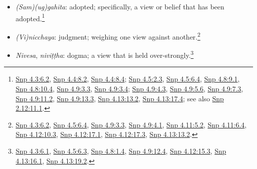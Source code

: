 \documentclass[12pt,openany]{book}%
\begin{document}
\begin{itemize}
\item \textit{(Sam)(ug)\textsanskrit{gahīta}}: adopted; specifically, a view or belief that has been adopted.\footnote{\href{https://suttacentral.net/snp4.3/en/sujato\#6.2}{Snp 4.3:6.2}, \href{https://suttacentral.net/snp4.4/en/sujato\#8.2}{Snp 4.4:8.2}, \href{https://suttacentral.net/snp4.4/en/sujato\#8.4}{Snp 4.4:8.4}; \href{https://suttacentral.net/snp4.5/en/sujato\#2.3}{Snp 4.5:2.3}, \href{https://suttacentral.net/snp4.5/en/sujato\#6.4}{Snp 4.5:6.4}, \href{https://suttacentral.net/snp4.8/en/sujato\#9.1}{Snp 4.8:9.1}, \href{https://suttacentral.net/snp4.8/en/sujato\#10.4}{Snp 4.8:10.4}, \href{https://suttacentral.net/snp4.9/en/sujato\#3.3}{Snp 4.9:3.3}, \href{https://suttacentral.net/snp4.9/en/sujato\#3.4}{Snp 4.9:3.4}; \href{https://suttacentral.net/snp4.9/en/sujato\#4.3}{Snp 4.9:4.3}, \href{https://suttacentral.net/snp4.9/en/sujato\#5.6}{Snp 4.9:5.6}, \href{https://suttacentral.net/snp4.9/en/sujato\#7.3}{Snp 4.9:7.3}, \href{https://suttacentral.net/snp4.9/en/sujato\#11.2}{Snp 4.9:11.2}, \href{https://suttacentral.net/snp4.9/en/sujato\#13.3}{Snp 4.9:13.3}, \href{https://suttacentral.net/snp4.13/en/sujato\#13.2}{Snp 4.13:13.2}, \href{https://suttacentral.net/snp4.13/en/sujato\#17.4}{Snp 4.13:17.4}; see also \href{https://suttacentral.net/snp2.12/en/sujato\#11.1}{Snp 2.12:11.1}. }%
\item \textit{(Vi)nicchaya}: judgment; weighing one view against another.\footnote{\href{https://suttacentral.net/snp4.3/en/sujato\#6.2}{Snp 4.3:6.2}, \href{https://suttacentral.net/snp4.5/en/sujato\#6.4}{Snp 4.5:6.4}, \href{https://suttacentral.net/snp4.9/en/sujato\#3.3}{Snp 4.9:3.3}, \href{https://suttacentral.net/snp4.9/en/sujato\#4.1}{Snp 4.9:4.1}, \href{https://suttacentral.net/snp4.11/en/sujato\#5.2}{Snp 4.11:5.2}, \href{https://suttacentral.net/snp4.11/en/sujato\#6.4}{Snp 4.11:6.4}, \href{https://suttacentral.net/snp4.12/en/sujato\#10.3}{Snp 4.12:10.3}, \href{https://suttacentral.net/snp4.12/en/sujato\#17.1}{Snp 4.12:17.1}, \href{https://suttacentral.net/snp4.12/en/sujato\#17.3}{Snp 4.12:17.3}, \href{https://suttacentral.net/snp4.13/en/sujato\#13.2}{Snp 4.13:13.2}. }%
\item \textit{Nivesa}, \textit{\textsanskrit{niviṭṭha}}: dogma; a view that is held over-strongly.\footnote{\href{https://suttacentral.net/snp4.3/en/sujato\#6.1}{Snp 4.3:6.1}, \href{https://suttacentral.net/snp4.5/en/sujato\#6.3}{Snp 4.5:6.3}, \href{https://suttacentral.net/snp4.8/en/sujato\#1.4}{Snp 4.8:1.4}, \href{https://suttacentral.net/snp4.9/en/sujato\#12.4}{Snp 4.9:12.4}, \href{https://suttacentral.net/snp4.12/en/sujato\#15.3}{Snp 4.12:15.3}, \href{https://suttacentral.net/snp4.13/en/sujato\#16.1}{Snp 4.13:16.1}, \href{https://suttacentral.net/snp4.13/en/sujato\#19.2}{Snp 4.13:19.2}. }%

\end{itemize}
\end{document}
